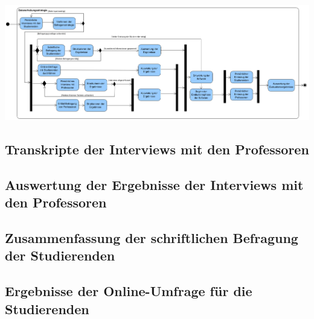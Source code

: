 \documentclass[bibliography=totoc,listof=totoc,BCOR=5mm,DIV=12,oneside]{scrbook}
\begin{document}
\newpage
\pagestyle{empty}%
\begin{center}
\includegraphics[scale=0.6, angle=90]{Bilder/Diagramme/AnalysestrategieDetails.png}
\end{center}

\newpage
\subsection{Transkripte der Interviews mit den Professoren}
\label{anhang:interviewProfessorenTranskripte}






\newpage
\subsection{Auswertung der Ergebnisse der Interviews mit den Professoren}
\label{anhang:interviewProfessorenAuswertung}


\newpage
\subsection{Zusammenfassung der schriftlichen Befragung der Studierenden}
\label{anhang:schriftlicheBefragungStudierendeZusammenfassung}


\newpage
\subsection{Ergebnisse der Online-Umfrage für die Studierenden}
\label{anhang:onlineUmfrageStudierendeErgebnisse}

\end{document}
